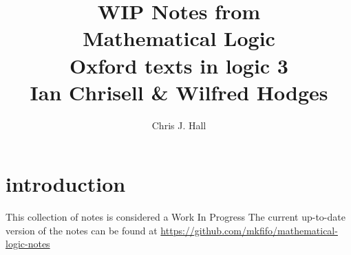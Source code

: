 \documentclass[a4paper, titlepage]{report}
\makeatletter
\renewcommand\subsection{\@startsection{subsection}{2}{\z@}
                                     {-3.25ex\@plus -1ex \@minus -.2ex}%
                                     {-1em}%
                                     {\normalfont\large\bfseries}}
\makeatother
\begin{document}
\newcommand{\RULE}[4]{
  {
  \iffalse
    TODO FIXME automate adding to rules sections
  \fi
  \bigskip
  \subsection{
    \texorpdfstring{
      \uppercase{#1 rule (#2)}
    }{
      #1 rule (#2 rule)
    }
  }
  \hfill page #3 \\
  \indent
  #4
  }
}

\newcommand{\EXERCISE}[4]{
  {
  \iffalse
    TODO FIXME automate adding to exercises list?
  \fi
  \bigskip
  \subsection{
    \texorpdfstring{
      Exercise #1
    }{
      Exercise #1
    }
  }
  \hfill page #2 \\
  \indent
  #3 \\
  \indent
  #4
  }
}


\begin{titlepage}
\title {WIP Notes from \\ Mathematical Logic \\ Oxford texts in logic 3 \\ Ian Chrisell \& Wilfred Hodges}
\author {Chris J. Hall}
\maketitle
\end{titlepage}

\tableofcontents


\newpage
{}

\chapter{introduction}


This collection of notes is considered a Work In Progress
The current up-to-date version of the notes can be found at \url{https://github.com/mkfifo/mathematical-logic-notes}
\end{document}
